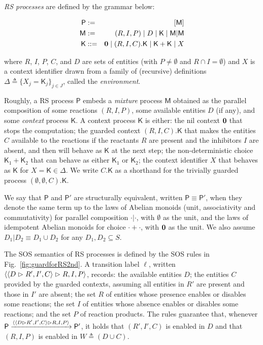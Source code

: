 \begin{definition}[RS processes]\label{def:LTSforRS}
\emph{RS processes} are defined by the grammar below:

\begin{eqnarray*}
\mathsf{P} & := & [\mathsf{M}]
\\
\mathsf{M} & := & (R,I,P) \mid D \mid \mathsf{K} \mid \mathsf{M}|\mathsf{M}
\\
\mathsf{K} & ::= & \mathbf{0} \mid (R,I,C).\mathsf{K} \mid \mathsf{K}+\mathsf{K} \mid X
\end{eqnarray*}

\noindent
where $R$, $I$, $P$, $C$, and $D$ are sets of entities (with $P\neq \emptyset$ and $R\cap I=\emptyset$) and $X$ is a context identifier drawn from a family of (recursive) definitions $\Delta \triangleq\{X_j=\mathsf{K}_j\}_{j\in J}$, called the \emph{environment}.
\end{definition}

Roughly, a RS process  $\mathsf{P}$ embeds a \emph{mixture} process $\mathsf{M}$ obtained as the parallel composition of some reactions $(R,I,P)$, some available entities $D$ (if any), and some \emph{context} process $\mathsf{K}$.
A  context process $\mathsf{K}$ is either: 
the nil context $\mathbf{0}$ that stops the computation;
the guarded context $(R,I,C).\mathsf{K}$ that makes the entities $C$ available to the reactions if the reactants $R$ are present and the inhibitors $I$ are absent, and then will behave as $\mathsf{K}$ at the next step;
the non-deterministic choice $\mathsf{K}_1+\mathsf{K}_2$ that can behave as either  $\mathsf{K}_1$ or $\mathsf{K}_2$;  
the context identifier $X$ that behaves as $\mathsf{K}$ for $X=\mathsf{K}\in \Delta$.
We write $C.\mathsf{K}$ as a shorthand for the trivially guarded process $(\emptyset,\emptyset,C).\mathsf{K}$.


We say that $\mathsf{P}$ and $\mathsf{P}'$ are structurally equivalent, written $\mathsf{P} \equiv \mathsf{P}'$, when they denote the same term up to the laws of Abelian monoids (unit, associativity and commutativity) for  parallel composition $\cdot | \cdot$, with $\emptyset$ as the unit, and the laws of idempotent Abelian monoids for choice $\cdot +\cdot$, with $\mathbf{0}$ as the unit. We also assume $D_1 | D_2 \equiv D_1\cup D_2$ for any $D_1,D_2\subseteq S$.

The SOS semantics of  RS processes is defined by the SOS rules in Fig.~\ref{fig:guardforRS2nd}.
A transition label $\ell$, written $\langle \langle D\vartriangleright R',I',C\rangle\vartriangleright R,I,P\rangle$, records:
the available entities $D$; the entities $C$ provided by the guarded contexts, assuming all entities in $R'$ are present and those in $I'$ are absent;
the set $R$ of entities whose presence enables or disables some reactions;
the set $I$ of entities whose absence  enables or disables some reactions;
and the set $P$ of reaction products.
The  rules guarantee that, whenever $\mathsf{P}\xrightarrow{\langle \langle D\vartriangleright R',I',C\rangle\vartriangleright R,I,P\rangle} \mathsf{P}'$, it holds that $(R',I',C)$ is enabled in $D$ and that
$(R,I,P)$ is enabled in $W\triangleq (D\cup C)$.

